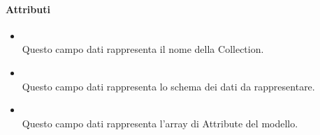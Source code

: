 \paragraph*{Attributi}
\begin{itemize}
\item[]  \\ Questo campo dati rappresenta il nome della Collection.
\item[]  \\ Questo campo dati rappresenta lo schema  dei dati da rappresentare.
\item[]  \\ Questo campo dati rappresenta l'array di Attribute del modello.
\end{itemize}


